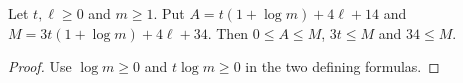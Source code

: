 \begin{theorem}
    \label{thm:soft_terminal_regional_norm}
    \leanok
    Let $t,\ell\ge0$ and $m\ge1$. Put
    $A=t(1+\log m)+4\ell+14$ and
    $M=3t(1+\log m)+4\ell+34$. Then
    $0\le A\le M$, $3t\le M$ and $34\le M$.
\end{theorem}
\begin{proof}\leanok
    Use $\log m\ge0$ and $t\log m\ge0$ in the two defining formulas.
\end{proof}
